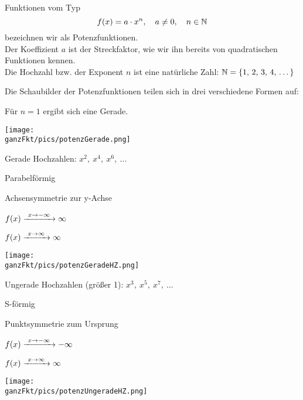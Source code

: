 Funktionen vom Typ
\[f(x)=a\cdot x^n, \quad a\neq 0, \quad n\in\mathbb{N}\]
bezeichnen wir als Potenzfunktionen.\\
Der Koeffizient \(a\) ist der Streckfaktor, wie wir ihn bereits von quadratischen Funktionen kennen.\\
Die Hochzahl bzw. der Exponent \(n\) ist eine natürliche Zahl: \(\mathbb{N}=\{1,\,2,\,3,\,4,\,\dots\}\)

Die Schaubilder der Potenzfunktionen teilen sich in drei verschiedene Formen auf:

\bigskip

\begin{minipage}{\textwidth}
	\begin{minipage}{0.6\textwidth}
		\centering\Large\textcolor{loes}{Für \(n=1\) ergibt sich eine Gerade.}
	\end{minipage}%
	\begin{minipage}{0.4\textwidth}
		\texttt{[image: \\ganzFkt/pics/potenzGerade.png]}
	\end{minipage}%

	\bigskip

	\begin{minipage}{0.6\textwidth}
		\centering\Large\textcolor{loes}{Gerade Hochzahlen: \(x^2,\ x^4,\ x^6,\ \dots\)}
			
			\textcolor{loes}{Parabelförmig}
			
			\textcolor{loes}{Achsensymmetrie zur y-Achse}
			
			\textcolor{loes}{\(f(x)\xrightarrow{\hphantom{\ }x\to-\infty\hphantom{\ }}\infty\)}
			
			\textcolor{loes}{\(f(x)\xrightarrow{\hphantom{\ }x\to\infty\hphantom{\ }}\infty\)}
	\end{minipage}%
	\begin{minipage}{0.4\textwidth}
		\texttt{[image: \\ganzFkt/pics/potenzGeradeHZ.png]}
	\end{minipage}%

	\bigskip

	\begin{minipage}{0.6\textwidth}
		\centering\Large\textcolor{loes}{Ungerade Hochzahlen (größer 1): \(x^3,\ x^5,\ x^7,\ \dots\)}
			
			\textcolor{loes}{S-förmig}
			
			\textcolor{loes}{Punktsymmetrie zum Ursprung}
			
			\textcolor{loes}{\(f(x)\xrightarrow{\hphantom{\ }x\to-\infty\hphantom{\ }}-\infty\)}
			
			\textcolor{loes}{\(f(x)\xrightarrow{\hphantom{\ }x\to\infty\hphantom{\ }}\infty\)}
	\end{minipage}%
	\begin{minipage}{0.4\textwidth}
		\texttt{[image: \\ganzFkt/pics/potenzUngeradeHZ.png]}
	\end{minipage}%
\end{minipage}
